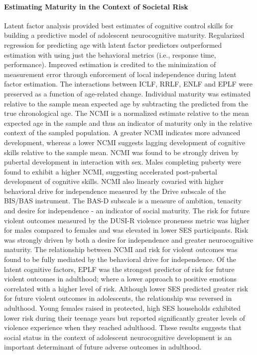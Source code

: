 \documentclass[utf8]{frontiersSCNS} %
\begin{document}
\paragraph*{Estimating Maturity in the Context of Societal Risk}
Latent factor analysis provided best estimates of cognitive control skills for building a predictive model of adolescent neurocognitive maturity. Regularized regression for predicting age with latent factor predictors outperformed estimation with using just the behavioral metrics (i.e., response time, performance). Improved estimation is credited to the minimization of measurement error through enforcement of local independence during latent factor estimation. The interactions between ICLF, RRLF, ENLF and EPLF were preserved as a function of age-related change. Individual maturity was estimated relative to the sample mean expected age by subtracting the predicted from the true chronological age. The NCMI is a normalized estimate relative to the mean expected age in the sample and thus an indicator of maturity only in the relative context of the sampled population. A greater NCMI indicates more advanced development, whereas a lower NCMI suggests lagging development of cognitive skills relative to the sample mean. NCMI was found to be strongly driven by pubertal development in interaction with sex. Males completing puberty were found to exhibit a higher NCMI, suggesting accelerated post-pubertal development of cognitive skills. NCMI also linearly covaried with higher behavioral drive for independence measured by the Drive subscale of the BIS/BAS instrument. The BAS-D subscale is a measure of ambition, tenacity and desire for independence - an indicator of social maturity. The risk for future violent outcomes measured by the DUSI-R violence proneness metric was higher for males compared to females and was elevated in lower SES participants. Risk was strongly driven by both a desire for independence and greater neurocognitive maturity. The relationship between NCMI and risk for violent outcomes was found to be fully mediated by the behavioral drive for independence. Of the latent cognitive factors, EPLF was the strongest predictor of risk for future violent outcomes in adulthood; where a lower approach to positive emotions correlated with a higher level of risk. Although lower SES predicted greater risk for future violent outcomes in adolescents, the relationship was reversed in adulthood. Young females raised in protected, high SES households exhibited lower risk during their teenage years but reported significantly greater levels of violence experience when they reached adulthood. These results suggests that social status in the context of adolescent neurocognitive development is an important determinant of future adverse outcomes in adulthood. 
\vspace{2pt}
\end{document}
